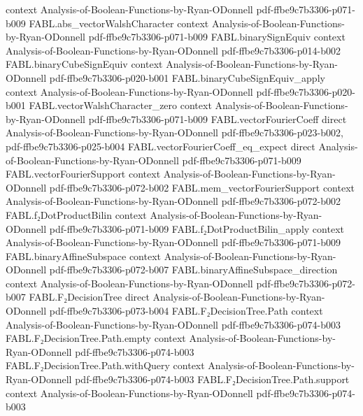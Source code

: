 \begin{theorem}
  {context}
  {Analysis-of-Boolean-Functions-by-Ryan-ODonnell}
  {pdf-ffbe9c7b3306-p071-b009}
\proofstep
  {FABL.abs_vectorWalshCharacter}
  {context}
  {Analysis-of-Boolean-Functions-by-Ryan-ODonnell}
  {pdf-ffbe9c7b3306-p071-b009}
\proofstep
  {FABL.binarySignEquiv}
  {context}
  {Analysis-of-Boolean-Functions-by-Ryan-ODonnell}
  {pdf-ffbe9c7b3306-p014-b002}
\proofstep
  {FABL.binaryCubeSignEquiv}
  {context}
  {Analysis-of-Boolean-Functions-by-Ryan-ODonnell}
  {pdf-ffbe9c7b3306-p020-b001}
\proofstep
  {FABL.binaryCubeSignEquiv_apply}
  {context}
  {Analysis-of-Boolean-Functions-by-Ryan-ODonnell}
  {pdf-ffbe9c7b3306-p020-b001}
\proofstep
  {FABL.vectorWalshCharacter_zero}
  {context}
  {Analysis-of-Boolean-Functions-by-Ryan-ODonnell}
  {pdf-ffbe9c7b3306-p071-b009}
\proofstep
  {FABL.vectorFourierCoeff}
  {direct}
  {Analysis-of-Boolean-Functions-by-Ryan-ODonnell}
  {pdf-ffbe9c7b3306-p023-b002,
    pdf-ffbe9c7b3306-p025-b004}
\proofstep
  {FABL.vectorFourierCoeff_eq_expect}
  {direct}
  {Analysis-of-Boolean-Functions-by-Ryan-ODonnell}
  {pdf-ffbe9c7b3306-p071-b009}
\proofstep
  {FABL.vectorFourierSupport}
  {context}
  {Analysis-of-Boolean-Functions-by-Ryan-ODonnell}
  {pdf-ffbe9c7b3306-p072-b002}
\proofstep
  {FABL.mem_vectorFourierSupport}
  {context}
  {Analysis-of-Boolean-Functions-by-Ryan-ODonnell}
  {pdf-ffbe9c7b3306-p072-b002}
\proofstep
  {FABL.f₂DotProductBilin}
  {context}
  {Analysis-of-Boolean-Functions-by-Ryan-ODonnell}
  {pdf-ffbe9c7b3306-p071-b009}
\proofstep
  {FABL.f₂DotProductBilin_apply}
  {context}
  {Analysis-of-Boolean-Functions-by-Ryan-ODonnell}
  {pdf-ffbe9c7b3306-p071-b009}
\proofstep
  {FABL.binaryAffineSubspace}
  {context}
  {Analysis-of-Boolean-Functions-by-Ryan-ODonnell}
  {pdf-ffbe9c7b3306-p072-b007}
\proofstep
  {FABL.binaryAffineSubspace_direction}
  {context}
  {Analysis-of-Boolean-Functions-by-Ryan-ODonnell}
  {pdf-ffbe9c7b3306-p072-b007}
\proofstep
  {FABL.F₂DecisionTree}
  {direct}
  {Analysis-of-Boolean-Functions-by-Ryan-ODonnell}
  {pdf-ffbe9c7b3306-p073-b004}
\proofstep
  {FABL.F₂DecisionTree.Path}
  {context}
  {Analysis-of-Boolean-Functions-by-Ryan-ODonnell}
  {pdf-ffbe9c7b3306-p074-b003}
\proofstep
  {FABL.F₂DecisionTree.Path.empty}
  {context}
  {Analysis-of-Boolean-Functions-by-Ryan-ODonnell}
  {pdf-ffbe9c7b3306-p074-b003}
\proofstep
  {FABL.F₂DecisionTree.Path.withQuery}
  {context}
  {Analysis-of-Boolean-Functions-by-Ryan-ODonnell}
  {pdf-ffbe9c7b3306-p074-b003}
\proofstep
  {FABL.F₂DecisionTree.Path.support}
  {context}
  {Analysis-of-Boolean-Functions-by-Ryan-ODonnell}
  {pdf-ffbe9c7b3306-p074-b003}
\proofstep

\end{theorem}
